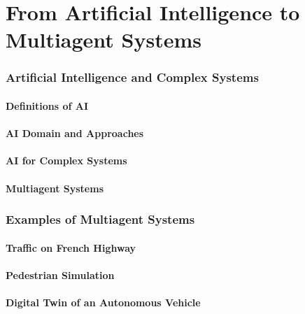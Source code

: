 



\part{From Artificial Intelligence to Multiagent Systems}
\begin{bibliographysection}

	\section{Artificial Intelligence and Complex Systems}
	\subsection{Definitions of AI}
	
	
	\subsection{AI Domain and Approaches}
	
	
	\subsection{AI for Complex Systems}
	
	\subsection{Multiagent Systems}
	

	\section[MABS Examples]{Examples of Multiagent Systems}
	\subsection{Traffic on French Highway}
	
	\subsection{Pedestrian Simulation}
	
	\subsection{Digital Twin of an Autonomous Vehicle}
	

	\thanksslide
\end{bibliographysection}


